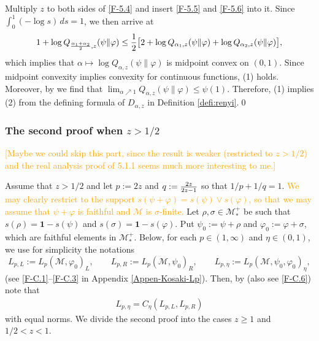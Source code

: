\documentclass[12pt]{article}
\theoremstyle{definition}
\theoremstyle{remark}
\numberwithin{equation}{section}
\def\Me{\mathcal M}
\def\ffi{\varphi}
\def\1{\mathbf{1}}
\begin{document}
Multiply $z$ to both sides of \eqref{F-5.4} and insert \eqref{F-5.5} and \eqref{F-5.6} into it. Since
$\int_0^1(-\log s)\,ds=1$, we then arrive at
\[
1+\log Q_{{\alpha_1+\alpha_2\over2},z}(\psi\|\ffi)
\le{1\over2}\bigl[2+\log Q_{\alpha_1,z}(\psi\|\ffi)+\log Q_{\alpha_2,z}(\psi\|\ffi)\bigr],
\]
which implies that $\alpha\mapsto\log Q_{\alpha,z}(\psi\|\ffi)$ is midpoint convex on $(0,1)$.
Since midpoint convexity implies convexity for continuous functions, (1) holds. Moreover, by
\cite[Theorem 1(vii)]{kato2023onrenyi} we find that
$\lim_{\alpha\nearrow1}Q_{\alpha,z}(\psi\|\ffi)\le\psi(1)$. Therefore, (1) implies (2) from the defining
formula of $D_{\alpha,z}$ in Definition \ref{defi:renyi}.\qed


\subsubsection{The second proof when $z>1/2$}\label{Sec-5.1.2}

\textcolor{orange}{[Maybe we could skip this part, since the result is weaker (restricted
to $z>1/2$) and the real analysis proof of 5.1.1 seems much more interesting to
me.]} 

Assume that $z>1/2$ and let $p:=2z$ and $q:={2z\over2z-1}$ so that $1/p+1/q=1$.
\textcolor{orange}{We may clearly restrict to the support $s(\psi+\ffi)=s(\psi)\vee
s(\ffi)$, so that we may assume that $\psi+\ffi$ is faithful and $\Me$ is $\sigma$-finite.} Let
$\rho,\sigma\in\Me_*^+$ be such that $s(\rho)=\1-s(\psi)$ and $s(\sigma)=\1-s(\ffi)$. Put
$\psi_0:=\psi+\rho$ and $\ffi_0:=\ffi+\sigma$, which are faithful elements in $\Me_*^+$. Below, for each
$p\in(1,\infty)$ and $\eta\in(0,1)$, we use for simplicity the notations
\[
L_{p,L}:=L_p(\Me,\ffi_0)_L,\qquad L_{p,R}:=L_p(\Me,\psi_0)_R,\qquad
L_{p,\eta}:=L_p(\Me,\psi_0,\ffi_0)_\eta,
\]
(see \eqref{F-C.1}--\eqref{F-C.3} in Appendix \ref{Appen-Kosaki-Lp}). Then, by
\cite[Theorem 11.1]{kosaki1984applications} (also see \eqref{F-C.6}) note that
\begin{align}\label{F-5.7}
L_{p,\eta}=C_\eta(L_{p,L},L_{p,R})
\end{align}
with equal norms. We divide the second proof into the cases $z\ge1$ and $1/2<z<1$.
\end{document}

